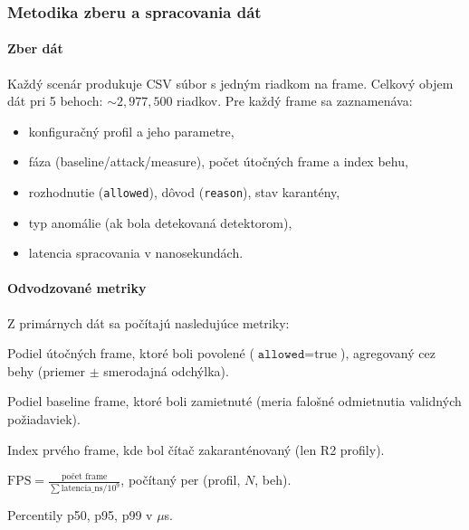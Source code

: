 \subsubsection{Metodika zberu a spracovania dát}
\label{sec:methodology}

\paragraph{Zber dát}

Každý scenár produkuje CSV súbor s jedným riadkom na frame. Celkový objem dát pri 5 behoch: ${\sim}2{,}977{,}500$ riadkov. Pre každý frame sa zaznamenáva:

\begin{itemize}[leftmargin=*,itemsep=2pt]
  \item konfiguračný profil a jeho parametre,
  \item fáza (baseline/attack/measure), počet útočných frame a index behu,
  \item rozhodnutie (\texttt{allowed}), dôvod (\texttt{reason}), stav karantény,
  \item typ anomálie (ak bola detekovaná detektorom),
  \item latencia spracovania v nanosekundách.
\end{itemize}

\paragraph{Odvodzované metriky}

Z primárnych dát sa počítajú nasledujúce metriky:

\begin{description}[leftmargin=*,itemsep=2pt]
  \item[Attack success rate:] Podiel útočných frame, ktoré boli povolené ($\texttt{allowed} = \text{true}$), agregovaný cez behy (priemer $\pm$ smerodajná odchýlka).
  \item[False reject rate:] Podiel baseline frame, ktoré boli zamietnuté (meria falošné odmietnutia validných požiadaviek).
  \item[Time to quarantine:] Index prvého frame, kde bol čítač zakaranténovaný (len R2 profily).
  \item[Throughput:] $\text{FPS} = \frac{\text{počet frame}}{\sum \text{latencia\_ns} / 10^9}$, počítaný per (profil, $N$, beh).
  \item[Latencia:] Percentily p50, p95, p99 v $\mu$s.
\end{description}

